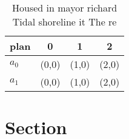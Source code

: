\documentclass[a4paper]{article}
\begin{document}
\begin{table}
\begin{adjustbox}{width=0.6\columnwidth}
\begin{tabular}{|l|l|l|l|}
\hline
\textbf{plan} & \multicolumn{1}{c|}{\textbf{0}} & \multicolumn{1}{c|}{\textbf{1}} & \multicolumn{1}{c|}{\textbf{2}} \\ \hline
\textbf{$a_0$}  & (0,0) & (1,0) & (2,0) \\ \hline
\textbf{$a_1$}  & (0,0) & (1,0) & (2,0) \\ \hline
\end{tabular}
\end{adjustbox}
\caption{Housed in mayor richard Tidal shoreline it The re
}
\end{table}

\section{Section}
\end{document}
